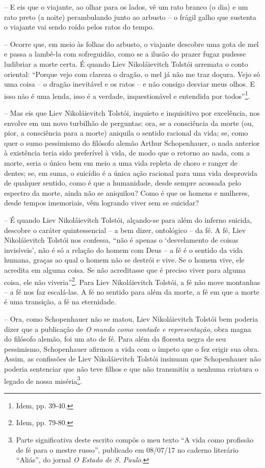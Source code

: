 -- E eis que o viajante, ao olhar para os lados, vê um rato branco (o
dia) e um rato preto (a noite) perambulando junto ao arbusto -- o frágil
galho que sustenta o viajante vai sendo roído pelos ratos do tempo.

-- Ocorre que, em meio às folhas do arbusto, o viajante descobre uma
gota de mel e passa a lambê-la com sofreguidão, como se a ilusão do
prazer fugaz pudesse ludibriar a morte certa. É quando Liev
Nikoláievitch Tolstói arremata o conto oriental: ``Porque vejo com
clareza o dragão, o mel já não me traz doçura. Vejo só uma coisa -- o
dragão inevitável e os ratos -- e não consigo desviar meus olhos. E isso
não é uma lenda, isso é a verdade, inquestionável e entendida por
todos''\footnote{Idem, pp. 39-40.}.

-- Mas eis que Liev Nikoláievitch Tolstói, inquieto e inquisitivo por
excelência, nos envolve em um novo turbilhão de perguntas: ora, se a
consciência da morte (ou, pior, a consciência para a morte) aniquila o
sentido racional da vida; se, como quer o sumo pessimismo do filósofo
alemão Arthur Schopenhauer, o nada anterior à existência teria sido
preferível à vida, de modo que o retorno ao nada, com a morte, seria o
único bem em meio a uma vida repleta de choro e ranger de dentes; se, em
suma, o suicídio é a única ação racional para uma vida desprovida de
qualquer sentido, como é que a humanidade, desde sempre acossada pelo
espectro da morte, ainda não se aniquilou? Como é que os homens e
mulheres, desde tempos imemoriais, vêm logrando viver sem se suicidar?

-- É quando Liev Nikoláievitch Tolstói, alçando-se para além do inferno
suicida, descobre o caráter quintessencial -- a bem dizer, ontológico --
da fé. A fé, Liev Nikoláievitch Tolstói nos confessa, ``não é apenas o
`desvelamento de coisas invisíveis', não é só a relação do homem com
Deus -- a fé é o sentido da vida humana, graças ao qual o homem não se
destrói e vive. Se o homem vive, ele acredita em alguma coisa. Se não
acreditasse que é preciso viver para alguma coisa, ele não
viveria''\footnote{Idem, pp. 79-80.}. Para Liev Nikoláievitch Tolstói, a
fé não move montanhas -- a fé nos faz escalá-las. A fé no sentido para
além da morte, a fé em que a morte é uma transição, a fé na eternidade.

-- Ora, como Schopenhauer não se matou, Liev Nikoláievitch Tolstói bem
poderia dizer que a publicação de \emph{O mundo como vontade e
representação}, obra magna do filósofo alemão, foi um ato de fé. Para
além da floresta negra de seu pessimismo, Schopenhauer afirmou a vida
com o ímpeto que o fez erigir sua obra. Assim, as confissões de Liev
Nikoláievitch Tolstói insinuam que Schopenhauer não poderia sentenciar
que não teve filhos e que não transmitiu a nenhuma criatura o legado de
nossa miséria\footnote{Parte significativa deste escrito compôs o meu
  texto ``A vida como profissão de fé para o mestre russo'', publicado
  em 08/07/17 no caderno literário ``Aliás'', do jornal \emph{O Estado
  de S. Paulo}.}.

